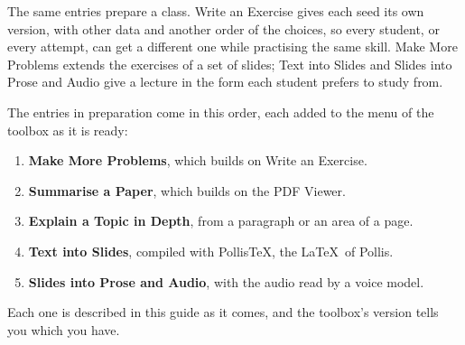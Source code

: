 The same entries prepare a class. Write an Exercise gives each seed its own version, with other data and
another order of the choices, so every student, or every attempt, can get a different one while practising
the same skill. Make More Problems extends the exercises of a set of slides; Text into Slides and Slides
into Prose and Audio give a lecture in the form each student prefers to study from.

The entries in preparation come in this order, each added to the menu of the toolbox as it is ready:
\begin{enumerate}[label=\arabic*.]
  \item \textbf{Make More Problems}, which builds on Write an Exercise.
  \item \textbf{Summarise a Paper}, which builds on the PDF Viewer.
  \item \textbf{Explain a Topic in Depth}, from a paragraph or an area of a page.
  \item \textbf{Text into Slides}, compiled with PollisTeX, the \LaTeX\ of Pollis.
  \item \textbf{Slides into Prose and Audio}, with the audio read by a voice model.
\end{enumerate}
Each one is described in this guide as it comes, and the toolbox's version tells you which you have.

\nmcredit


